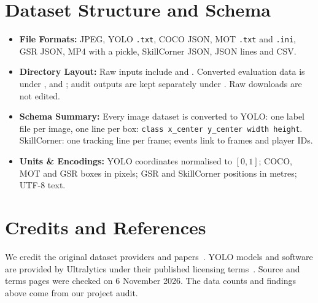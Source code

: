 \documentclass[11pt, a4paper]{article}
\begin{document}
\section{Dataset Structure and Schema}
\begin{itemize}
    \item \textbf{File Formats:} JPEG, YOLO \texttt{.txt}, COCO JSON, MOT \texttt{.txt} and \texttt{.ini}, GSR JSON, MP4 with a pickle, SkillCorner JSON, JSON lines and CSV.
    \item \textbf{Directory Layout:} Raw inputs include  and . Converted evaluation data is under ,  and ; audit outputs are kept separately under . Raw downloads are not edited.
    \item \textbf{Schema Summary:} Every image dataset is converted to YOLO: one label file per image, one line per box: \texttt{class x\_center y\_center width height}. SkillCorner: one tracking line per frame; events link to frames and player IDs.
    \item \textbf{Units \& Encodings:} YOLO coordinates normalised to $[0,1]$; COCO, MOT and GSR boxes in pixels; GSR and SkillCorner positions in metres; UTF-8 text.
\end{itemize}

\clearpage
\section{Credits and References}
We credit the original dataset providers and papers~\cite{soccana,tracking,multisports,football,skillcorner,gsr}. YOLO models and software are provided by Ultralytics under their published licensing terms~\cite{ultralytics}. Source and terms pages were checked on 6 November 2026. The data counts and findings above come from our project audit.
\footnotesize


\end{document}
